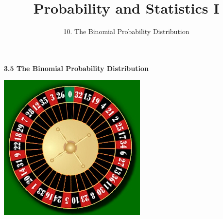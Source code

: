 

\usepackage{enumitem}

\newcommand{\lecturenum}{10}

\title[SS2857]{Probability and Statistics I}
\subtitle{\lecturenum. The Binomial Probability Distribution}

\date{}






{

\begin{frame}
  \addtocounter{framenumber}{-1}

  \maketitle
\end{frame}
}

\begin{frame}
  \frametitle{}

  \begin{center}
    \Large{\textbf{3.5 The Binomial Probability Distribution}}
  \end{center}

  \begin{center}
    \includegraphics[height=.5\textheight]{roulette_wheel}
  \end{center}

\end{frame}

